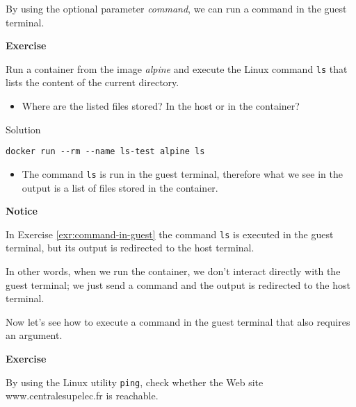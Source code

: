\documentclass[
]{article}
\providecommand{\tightlist}{%
  \setlength{\itemsep}{0pt}\setlength{\parskip}{0pt}}
\newenvironment{infobox}[1]
  {
  \begin{itemize}
  \renewcommand{\labelitemi}{
    \raisebox{-.7\height}[0pt][0pt]{
      
    }
  }
  \setlength{\fboxsep}{1em}
  \begin{whitebox}
  \item
  }
  {
  \end{whitebox}
  \end{itemize}
  }
\theoremstyle{definition}
\theoremstyle{definition}
\theoremstyle{definition}
\theoremstyle{remark}
\let\BeginKnitrBlock\begin \let\EndKnitrBlock\end
\begin{document}
By using the optional parameter \emph{command}, we can run
a command in the guest terminal.

\begin{infobox}{exercisebox}

\textbf{Exercise}

\BeginKnitrBlock{exercise}
\protect\hypertarget{exr:command-in-guest}{}{\label{exr:command-in-guest} }
Run a container from the image \emph{alpine} and execute the
Linux command \texttt{ls} that lists the content of the current directory.

\begin{itemize}
\tightlist
\item
  Where are the listed files stored?
  In the host or in the container?
\end{itemize}
\EndKnitrBlock{exercise}

\end{infobox}

Solution

\begin{infobox}{exercisebox}

\begin{verbatim}
docker run --rm --name ls-test alpine ls
\end{verbatim}

\begin{itemize}
\tightlist
\item
  The command \texttt{ls} is run in the guest terminal, therefore
  what we see in the output is a list of files stored in the
  container.
\end{itemize}

\end{infobox}

\begin{infobox}{warning}

\textbf{Notice}

In Exercise \ref{exr:command-in-guest} the command
\texttt{ls} is executed in the guest terminal, but its
output is redirected to the host terminal.

In other words, when we run the container, we
don't interact directly with the guest terminal;
we just send a command and the output is redirected
to the host terminal.

\end{infobox}

Now let's see how to execute a command in the guest terminal
that also requires an argument.

\begin{infobox}{exercisebox}

\textbf{Exercise}

\BeginKnitrBlock{exercise}
\protect\hypertarget{exr:unnamed-chunk-7}{}{\label{exr:unnamed-chunk-7} }By using the Linux utility \texttt{ping}, check
whether the Web site www.centralesupelec.fr is reachable.
\EndKnitrBlock{exercise}

\end{infobox}
\end{document}
